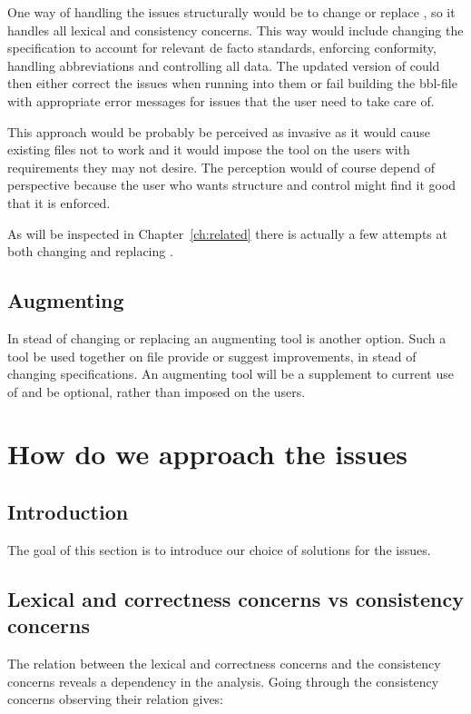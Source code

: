 One way of handling the issues structurally would be to change or
replace {\bibtex}, so it handles all lexical and consistency concerns.
This way would include changing the {\bibtex} specification to account
for relevant de facto standards, enforcing conformity, handling
abbreviations and controlling all data.  The updated version of
{\bibtex} could then either correct the issues when running into them
or fail building the bbl-file with appropriate error messages for
issues that the user need to take care of.

This approach would be probably be perceived as invasive as it would
cause existing {\bibtex} files not to work and it would impose the
tool on the users with requirements they may not desire.  The
perception would of course depend of perspective because the user who
wants structure and control might find it good that it is enforced.

As will be inspected in Chapter~\ref{ch:related} there is actually a
few attempts at both changing and replacing {\bibtex}.


\subsection{Augmenting {\bibtex}}

In stead of changing or replacing {\bibtex} an augmenting tool is
another option.  Such a tool be used together on {\bibtex} file
provide or suggest improvements, in stead of changing specifications.
An augmenting tool will be a supplement to current use of {\bibtex}
and be optional, rather than imposed on the users.


\section{How do we approach the {\bibtex} issues}
\subsection{Introduction}

The goal of this section is to introduce our choice of solutions for
the issues.


\subsection{Lexical and correctness concerns vs consistency concerns}
\label{sec:approach_lexical_consistency}

The relation between the lexical and correctness concerns and the
consistency concerns reveals a dependency in the analysis.  Going
through the consistency concerns observing their relation gives:

